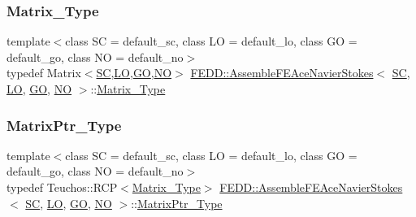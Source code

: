 \subsubsection{\texorpdfstring{Matrix\+\_\+\+Type}{Matrix\_Type}}
{\footnotesize\ttfamily template$<$class SC  = default\+\_\+sc, class LO  = default\+\_\+lo, class GO  = default\+\_\+go, class NO  = default\+\_\+no$>$ \\
typedef Matrix$<$\hyperlink{fe__test__laplace_8cpp_a79c7e86a57edbb2a5a53242bcd04e41e}{SC},\hyperlink{fe__test__laplace_8cpp_ad6a38c9f07d3fd633eefca5bccad8410}{LO},\hyperlink{fe__test__laplace_8cpp_afa2946b509009b4f45eb04bd8c5b27d9}{GO},\hyperlink{fe__test__laplace_8cpp_a5e24f37b28787429872b6ecb1d0417ce}{NO}$>$ \hyperlink{classFEDD_1_1AssembleFEAceNavierStokes}{F\+E\+D\+D\+::\+Assemble\+F\+E\+Ace\+Navier\+Stokes}$<$ \hyperlink{fe__test__laplace_8cpp_a79c7e86a57edbb2a5a53242bcd04e41e}{SC}, \hyperlink{fe__test__laplace_8cpp_ad6a38c9f07d3fd633eefca5bccad8410}{LO}, \hyperlink{fe__test__laplace_8cpp_afa2946b509009b4f45eb04bd8c5b27d9}{GO}, \hyperlink{fe__test__laplace_8cpp_a5e24f37b28787429872b6ecb1d0417ce}{NO} $>$\+::\hyperlink{classFEDD_1_1AssembleFEAceNavierStokes_a077bd68fc7a8d900e2a2407dd1265244}{Matrix\+\_\+\+Type}}

\mbox{\label{classFEDD_1_1AssembleFEAceNavierStokes_aea5985e9fd4e072a47d8223c6c5f81c0}} 
\subsubsection{\texorpdfstring{Matrix\+Ptr\+\_\+\+Type}{MatrixPtr\_Type}}
{\footnotesize\ttfamily template$<$class SC  = default\+\_\+sc, class LO  = default\+\_\+lo, class GO  = default\+\_\+go, class NO  = default\+\_\+no$>$ \\
typedef Teuchos\+::\+R\+CP$<$\hyperlink{classFEDD_1_1AssembleFEAceNavierStokes_a077bd68fc7a8d900e2a2407dd1265244}{Matrix\+\_\+\+Type}$>$ \hyperlink{classFEDD_1_1AssembleFEAceNavierStokes}{F\+E\+D\+D\+::\+Assemble\+F\+E\+Ace\+Navier\+Stokes}$<$ \hyperlink{fe__test__laplace_8cpp_a79c7e86a57edbb2a5a53242bcd04e41e}{SC}, \hyperlink{fe__test__laplace_8cpp_ad6a38c9f07d3fd633eefca5bccad8410}{LO}, \hyperlink{fe__test__laplace_8cpp_afa2946b509009b4f45eb04bd8c5b27d9}{GO}, \hyperlink{fe__test__laplace_8cpp_a5e24f37b28787429872b6ecb1d0417ce}{NO} $>$\+::\hyperlink{classFEDD_1_1AssembleFEAceNavierStokes_aea5985e9fd4e072a47d8223c6c5f81c0}{Matrix\+Ptr\+\_\+\+Type}}

